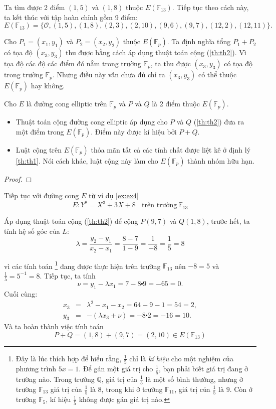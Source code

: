 Ta tìm được 2 điểm $(1,5)$ và $(1,8)$ thuộc $E(\mathbb{F}_{13})$. Tiếp tục theo cách này, ta kết thúc với tập hoàn chỉnh gồm 9 điểm:
$$E(\mathbb{F}_{13}) = \{ \mathcal{O}, (1,5), (1,8), (2,3), (2,10), (9,6), (9,7), (12,2), (12,11)\}.$$

Cho $P_1 = (x_1, y_1)$ và $P_2 = (x_2, y_2)$ thuộc $E(\mathbb{F}_{p})$. Ta định nghĩa tổng $P_1+P_2$ có tọa độ $(x_3, y_3)$ thu được bằng cách áp dụng thuật toán cộng (\ref{th:th2}).
Vì tọa độ các độ các điểm đó nằm trong trường $\mathbb{F}_p$, ta thu được $(x_3, y_3)$ có tọa độ trong trường $\mathbb{F}_p$. Nhưng điều này vẫn chưa đủ chỉ ra
$(x_3, y_3)$ có thể thuộc $E(\mathbb{F}_{p})$ hay không.

\begin{theorem}
	\label{th:th3}
	Cho $E$ là đường cong elliptic trên $\mathbb{F}_p$ và $P$ và $Q$ là 2 điểm thuộc $E(\mathbb{F}_{p})$.
	\begin{itemize}
		\item Thuật toán cộng đường cong elliptic áp dụng cho $P$ và $Q$ (\ref{th:th2}) đưa ra một điểm trong $E(\mathbb{F}_{p})$.
		      Điểm này được kí hiệu bởi $P + Q$.
		\item Luật cộng trên $E(\mathbb{F}_{p})$ thỏa mãn tất cả các tính chất được liệt kê ở định lý \ref{th:th1}.
		      Nói cách khác, luật cộng này làm cho $E(\mathbb{F}_{p})$ thành nhóm hữu hạn.
	\end{itemize}
\end{theorem}

\begin{proof}

\end{proof}

\begin{example}
	\label{ex:ex5}
	Tiếp tục với đường cong $E$ từ ví dụ \ref{ex:ex4}
	$$ E: Y^2 = X^3 + 3X + 8 \ \ \ \ \text{trên trường}\  \mathbb{F}_{13} $$
\end{example}
Áp dụng thuật toán cộng (\ref{th:th2}) để cộng $P(9,7)$ và $Q(1,8)$, trước hết, ta tính hệ số góc của $L$:
$$\lambda  =\frac{y_2-y_1}{x_2-x_1} = \frac{8-7}{1-9} = \frac{1}{-8} = \frac{1}{5} = 8$$

vì các tính toán \footnote{Đây là lúc thích hợp để hiểu rằng, $\frac{1}{5}$ chỉ là \textit{kí hiệu} cho một nghiệm của phương trình $5x=1$.
	Để gán một giá trị cho $\frac{1}{5}$, bạn phải biết giá trị đang ở trường nào. Trong trường $\mathbb{Q}$, giá trị của $\frac{1}{5}$ là một số bình thường,
	nhưng ở trường $\mathbb{F}_{13}$ giá trị của $\frac{1}{5}$ là $8$, trong khi ở trường $\mathbb{F}_{11}$, giá trị của $\frac{1}{5}$ là $9$.
	Còn ở trường $\mathbb{F}_5$, kí hiệu $\frac{1}{5}$ không được gán giá trị nào.} đang được thực hiện trên trường $\mathbb{F}_{13}$ nên $-8 = 5$ và $\frac{1}{5} = 5^{-1} = 8$.
Tiếp tục, ta tính
$$\nu = y_1 - \lambda x_1 = 7 - 8 \centerdot 9 = -65 = 0.$$
Cuối cùng:
$$
	\begin{array}{rcl}
		x_3 & = & \lambda^2 - x_1 - x_2 = 64 -9 -1 = 54 = 2,         \\
		y_3 & = & -(\lambda x_3 + \nu) = -8 \centerdot 2 = -16 = 10.
	\end{array}
$$
Và ta hoàn thành việc tính toán
$$P+Q = (1,8) + (9,7) = (2,10) \in E(\mathbb{F}_{13})$$

